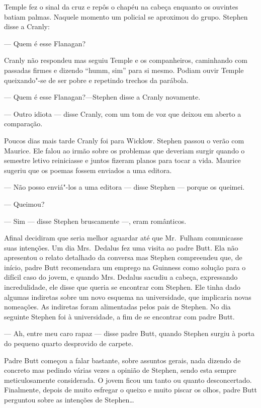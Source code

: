Temple fez o sinal da cruz e repôs o chapéu na cabeça enquanto os
ouvintes batiam palmas.  Naquele momento um policial se aproximou do
grupo.  Stephen disse a Cranly:

--- Quem é esse Flanagan?

Cranly não respondeu mas seguiu Temple e os companheiros, caminhando
com passadas firmes e dizendo “humm, sim” para si mesmo.  Podiam ouvir
Temple queixando"-se de ser pobre e repetindo trechos da parábola.

--- Quem é esse Flanagan?—Stephen disse a Cranly novamente.

--- Outro idiota --- disse Cranly, com um tom de voz que deixou em
aberto a comparação.

Poucos dias mais tarde Cranly foi para Wicklow.  Stephen passou o
verão com Maurice.  Ele falou ao irmão sobre os problemas que deveriam
surgir quando o semestre letivo reiniciasse e juntos fizeram planos
para tocar a vida.  Maurice sugeriu que os poemas fossem enviados a uma
editora.

--- Não posso enviá"-los a uma editora --- disse Stephen --- porque os
queimei.

--- Queimou?

--- Sim --- disse Stephen bruscamente ---, eram românticos.

Afinal decidiram que seria melhor aguardar até que Mr.~Fulham
comunicasse suas intenções.  Um dia Mrs.~Dedalus fez uma visita ao
padre Butt.  Ela não apresentou o relato detalhado da conversa mas
Stephen compreendeu que, de início, padre Butt recomendara um emprego
na Guinness como solução para o difícil caso do jovem, e quando Mrs.
Dedalus sacudiu a cabeça, expressando incredulidade, ele disse que
queria se encontrar com Stephen.  Ele tinha dado algumas indiretas
sobre um novo esquema na universidade, que implicaria novas nomeações. 
As indiretas foram alimentadas pelos pais de Stephen.  No dia seguinte
Stephen foi à universidade, a fim de se encontrar com padre Butt.

--- Ah, entre meu caro rapaz --- disse padre Butt, quando Stephen
surgiu à porta do pequeno quarto desprovido de carpete.

Padre Butt começou a falar bastante, sobre assuntos gerais, nada
dizendo de concreto mas pedindo várias vezes a opinião de Stephen,
sendo esta sempre meticulosamente considerada.  O jovem ficou um tanto
ou quanto desconcertado.  Finalmente, depois de muito esfregar o queixo
e muito piscar os olhos, padre Butt perguntou sobre as intenções de
Stephen\ldots{}

